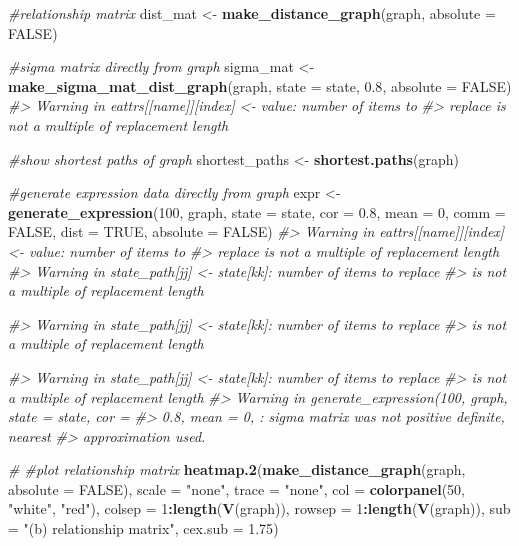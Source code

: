 \documentclass[]{article}
\newenvironment{Shaded}{\begin{snugshade}}{\end{snugshade}}
\newcommand{\CommentTok}[1]{\textcolor[rgb]{0.56,0.35,0.01}{\textit{#1}}}
\newcommand{\DataTypeTok}[1]{\textcolor[rgb]{0.13,0.29,0.53}{#1}}
\newcommand{\DecValTok}[1]{\textcolor[rgb]{0.00,0.00,0.81}{#1}}
\newcommand{\FloatTok}[1]{\textcolor[rgb]{0.00,0.00,0.81}{#1}}
\newcommand{\KeywordTok}[1]{\textcolor[rgb]{0.13,0.29,0.53}{\textbf{#1}}}
\newcommand{\NormalTok}[1]{#1}
\newcommand{\OperatorTok}[1]{\textcolor[rgb]{0.81,0.36,0.00}{\textbf{#1}}}
\newcommand{\OtherTok}[1]{\textcolor[rgb]{0.56,0.35,0.01}{#1}}
\newcommand{\StringTok}[1]{\textcolor[rgb]{0.31,0.60,0.02}{#1}}
\begin{document}
\begin{Shaded}
\begin{Highlighting}[]
{\CommentTok{#relationship matrix}
\NormalTok{dist_mat <-}\StringTok{ }\KeywordTok{make_distance_graph}\NormalTok{(graph, }\DataTypeTok{absolute =} \OtherTok{FALSE}\NormalTok{)}

\CommentTok{#sigma matrix directly from graph}
\NormalTok{sigma_mat <-}\StringTok{ }\KeywordTok{make_sigma_mat_dist_graph}\NormalTok{(graph, }\DataTypeTok{state =}\NormalTok{ state, }\FloatTok{0.8}\NormalTok{, }\DataTypeTok{absolute =} \OtherTok{FALSE}\NormalTok{)}
\CommentTok{#> Warning in eattrs[[name]][index] <- value: number of items to}
\CommentTok{#> replace is not a multiple of replacement length}

\CommentTok{#show shortest paths of graph}
\NormalTok{shortest_paths <-}\StringTok{ }\KeywordTok{shortest.paths}\NormalTok{(graph)}

\CommentTok{#generate expression data directly from graph}
\NormalTok{expr <-}\StringTok{ }\KeywordTok{generate_expression}\NormalTok{(}\DecValTok{100}\NormalTok{, graph, }\DataTypeTok{state =}\NormalTok{ state, }\DataTypeTok{cor =} \FloatTok{0.8}\NormalTok{, }\DataTypeTok{mean =} \DecValTok{0}\NormalTok{, }\DataTypeTok{comm =} \OtherTok{FALSE}\NormalTok{,}
                            \DataTypeTok{dist =} \OtherTok{TRUE}\NormalTok{, }\DataTypeTok{absolute =} \OtherTok{FALSE}\NormalTok{)}
\CommentTok{#> Warning in eattrs[[name]][index] <- value: number of items to}
\CommentTok{#> replace is not a multiple of replacement length}
\CommentTok{#> Warning in state_path[jj] <- state[kk]: number of items to replace}
\CommentTok{#> is not a multiple of replacement length}

\CommentTok{#> Warning in state_path[jj] <- state[kk]: number of items to replace}
\CommentTok{#> is not a multiple of replacement length}

\CommentTok{#> Warning in state_path[jj] <- state[kk]: number of items to replace}
\CommentTok{#> is not a multiple of replacement length}
\CommentTok{#> Warning in generate_expression(100, graph, state = state, cor =}
\CommentTok{#> 0.8, mean = 0, : sigma matrix was not positive definite, nearest}
\CommentTok{#> approximation used.}

\CommentTok{# #plot relationship matrix}
\KeywordTok{heatmap.2}\NormalTok{(}\KeywordTok{make_distance_graph}\NormalTok{(graph, }\DataTypeTok{absolute =} \OtherTok{FALSE}\NormalTok{),}
          \DataTypeTok{scale =} \StringTok{"none"}\NormalTok{, }\DataTypeTok{trace =} \StringTok{"none"}\NormalTok{, }\DataTypeTok{col =} \KeywordTok{colorpanel}\NormalTok{(}\DecValTok{50}\NormalTok{, }\StringTok{"white"}\NormalTok{, }\StringTok{"red"}\NormalTok{),}
\DataTypeTok{colsep =} \DecValTok{1}\OperatorTok{:}\KeywordTok{length}\NormalTok{(}\KeywordTok{V}\NormalTok{(graph)), }\DataTypeTok{rowsep =} \DecValTok{1}\OperatorTok{:}\KeywordTok{length}\NormalTok{(}\KeywordTok{V}\NormalTok{(graph)),}
              \DataTypeTok{sub =} \StringTok{"(b) relationship matrix"}\NormalTok{, }\DataTypeTok{cex.sub =} \FloatTok{1.75}\NormalTok{)}

}
\end{Highlighting}
\end{Shaded}
\end{document}
